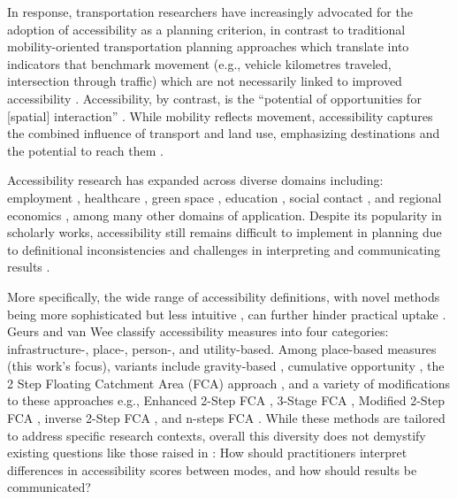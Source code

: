 \documentclass[
  10pt,
  letterpaper,
]{article}
\begin{document}
In response, transportation researchers have increasingly advocated for
the adoption of accessibility as a planning criterion, in contrast to
traditional mobility-oriented transportation planning approaches which
translate into indicators that benchmark movement (e.g., vehicle
kilometres traveled, intersection through traffic) which are not
necessarily linked to improved accessibility
\citep{silvaAccessibilityInstrumentsPlanning2017, paez_developing_2013, handy2020, elgeneidyMakingAccessibilityWork2022}.
Accessibility, by contrast, is the ``potential of opportunities for
{[}spatial{]} interaction'' \citep{hansen1959}. While mobility reflects
movement, accessibility captures the combined influence of transport and
land use, emphasizing destinations and the potential to reach them
\citep{handyMeasuringAccessibilityExploration1997}.

Accessibility research has expanded across diverse domains including:
employment
\citep{karstEvaluationAccessibilityImpacts2003, grengs2010job, paez_jobs_2013, merlin2017competition, tao_investigating_2020},
healthcare
\citep{luo2003, paez_healthcare_2010, wan2012three, delamater2013spatial, boisjoly2017informality, pereira_2021_geographic, yang2024evaluating},
green space
\citep{reyesAccessibility2014, rojas_accessibility_2016, liang_novel_2024},
education
\citep{williams_disparities_2014, romanillosAccessibilitySchoolsSpatial2018, marques_accessibility_2021},
social contact
\citep{neutens_human_2007, farberActivitySpacesMeasurement2012, farber_2013_social},
and regional economics
\citep{vickermanAccessibility1999, lopezMeasuring2008, ribeiro_road_2010, gutierrez_evaluating_2011},
among many other domains of application. Despite its popularity in
scholarly works, accessibility still remains difficult to implement in
planning due to definitional inconsistencies
\citep{vanweeAccessible2016, handy2020, kapatsila_resolving_2023} and
challenges in interpreting and communicating results
\citep{geursAccessibilityEvaluationLanduse2004, vanweeAccessible2016, ferreiraReenactingMobilityAccessibility2020}.

More specifically, the wide range of accessibility definitions, with
novel methods being more sophisticated but less intuitive
\citep{kapatsila_resolving_2023}, can further hinder practical uptake
\citep{vanweeAccessible2016}. Geurs and van Wee
\citep{geursAccessibilityEvaluationLanduse2004} classify accessibility
measures into four categories: infrastructure-, place-, person-, and
utility-based. Among place-based measures (this work's focus), variants
include gravity-based \citep{hansen1959}, cumulative opportunity
\citep{pirie_measuring_1979}, the 2 Step Floating Catchment Area (FCA)
approach \citep{luo2003}, and a variety of modifications to these
approaches e.g., Enhanced 2-Step FCA \citep{luoEnhanced2009}, 3-Stage
FCA \citep{wan2012three}, Modified 2-Step FCA
\citep{delamater2013spatial}, inverse 2-Step FCA
\citep{wang_2sfca_2021}, and n-steps FCA \citep{liang_novel_2024}. While
these methods are tailored to address specific research contexts,
overall this diversity does not demystify existing questions like those
raised in \citep{vanweeAccessible2016}: How should practitioners
interpret differences in accessibility scores between modes, and how
should results be communicated?
\end{document}
